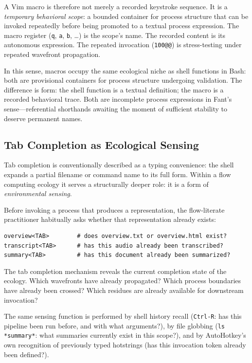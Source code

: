 \documentclass[12pt, a4paper]{article}
\begin{document}
A Vim macro is therefore not merely a recorded keystroke sequence.
It is a \emph{temporary behavioral scope}: a bounded container
for process structure that can be invoked repeatedly before being
promoted to a textual process expression. The macro register
(\texttt{q}, \texttt{a}, \texttt{b}, \ldots) is the scope's
name. The recorded content is its autonomous expression. The
repeated invocation (\texttt{100@@}) is stress-testing under
repeated wavefront propagation.

In this sense, macros occupy the same ecological niche as shell
functions in Bash: both are provisional containers for process
structure undergoing validation. The difference is form: the
shell function is a textual definition; the macro is a recorded
behavioral trace. Both are incomplete process expressions in
Fant's sense---referential shorthands awaiting the moment of
sufficient stability to deserve permanent names.

\subsection{Tab Completion as Ecological Sensing}

Tab completion is conventionally described as a typing convenience:
the shell expands a partial filename or command name to its full
form. Within a flow computing ecology it serves a structurally
deeper role: it is a form of \emph{environmental sensing}.

Before invoking a process that produces a representation, the
flow-literate practitioner habitually asks whether that
representation already exists:

\begin{lstlisting}
overview<TAB>        # does overview.txt or overview.html exist?
transcript<TAB>      # has this audio already been transcribed?
summary<TAB>         # has this document already been summarized?
\end{lstlisting}

The tab completion mechanism reveals the current completion state
of the ecology. Which wavefronts have already propagated? Which
process boundaries have already been crossed? Which residues are
already available for downstream invocation?

The same sensing function is performed by shell history recall
(\texttt{Ctrl-R}: has this pipeline been run before, and with
what arguments?), by file globbing (\texttt{ls *summary*}: what
summaries currently exist in this scope?), and by AutoHotkey's
own recognition of previously typed hotstrings (has this
invocation token already been defined?).
\end{document}
